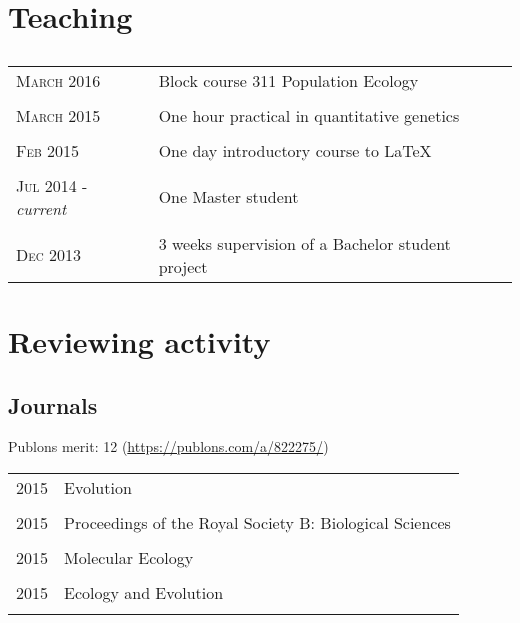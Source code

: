 \documentclass[a4paper,10pt]{article} %
\begin{document}
\section*{Teaching}
\subsection*{}
\begin{tabular}{p{4cm}|p{11cm}}
\hfill \textsc{March 2016} & Block course 311 Population Ecology \\
\multicolumn{2}{c}{} \\
\hfill \textsc{March 2015} & One hour practical in quantitative genetics\\
\multicolumn{2}{c}{} \\
\hfill \textsc{Feb 2015} & One day introductory course to \LaTeX\\
\multicolumn{2}{c}{} \\
\hfill \textsc{Jul 2014 -} \emph{current} & One Master student\\
\multicolumn{2}{c}{} \\
\hfill \textsc{Dec 2013} & 3 weeks supervision of a Bachelor student project\\
\end{tabular}

\section*{Reviewing activity}
\subsection*{Journals}
Publons merit: 12 (\url{https://publons.com/a/822275/})
\begin{table}[h]
\begin{tabular}{p{4cm}|p{11cm}}
\hfill \textsc{2015} & Evolution\\
\multicolumn{2}{c}{} \\
\hfill \textsc{2015} & Proceedings of the Royal Society B: Biological Sciences\\
\multicolumn{2}{c}{} \\
\hfill \textsc{2015} & Molecular Ecology\\
\multicolumn{2}{c}{} \\
\hfill \textsc{2015} & Ecology and Evolution\\
\multicolumn{2}{c}{} \\
\end{tabular}
\end{table}
\end{document}

